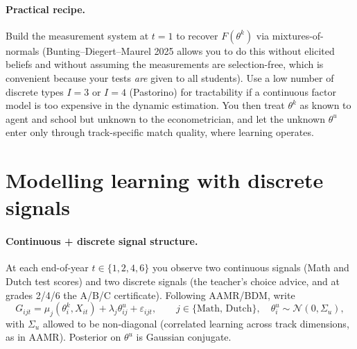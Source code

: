 \documentclass{article}
\begin{document}
\paragraph{Practical recipe.}  Build the measurement system at $t=1$ to
recover $F(\theta^k)$ via mixtures-of-normals (Bunting--Diegert--Maurel 2025
allows you to do this without elicited beliefs and without assuming the
measurements are selection-free, which is convenient because your tests
\emph{are} given to all students). Use a low number of discrete types $I=3$ or
$I=4$ (Pastorino) for tractability if a continuous factor model is too
expensive in the dynamic estimation. You then treat $\theta^k$ as known to
agent and school but unknown to the econometrician, and let the unknown
$\theta^u$ enter only through track-specific match quality, where learning
operates.

\section{Modelling learning with discrete signals}

\paragraph{Continuous + discrete signal structure.}  At each end-of-year
$t \in \{1,2,4,6\}$ you observe two continuous signals (Math and Dutch test
scores) and two discrete signals (the teacher's choice advice, and at grades
2/4/6 the A/B/C certificate). Following AAMR/BDM, write
\[
  G_{ijt} = \mu_j(\theta^k_i, X_{it}) + \lambda_j \theta^u_{ij} + \varepsilon_{ijt},
  \qquad j \in \{\text{Math, Dutch}\}, \quad
  \theta^u_i \sim \mathcal{N}(0,\Sigma_u),
\]
with $\Sigma_u$ allowed to be non-diagonal (correlated learning across track
dimensions, as in AAMR). Posterior on $\theta^u$ is Gaussian conjugate.
\end{document}
